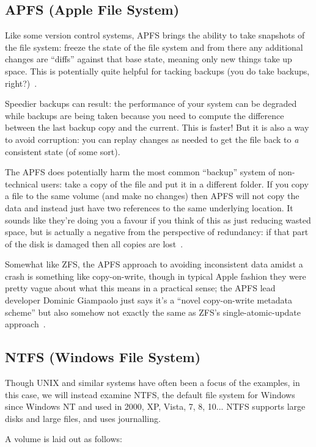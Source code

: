 \subsection*{APFS (Apple File System)}

Like some version control systems, APFS brings the ability to take snapshots of the file system: freeze the state of the file system and from there any additional changes are ``diffs'' against that base state, meaning only new things take up space. This is potentially quite helpful for tacking backups (you do take backups, right?)~\cite{apfs}.

Speedier backups can result: the performance of your system can be degraded while backups are being taken because you need to compute the difference between the last backup copy and the current. This is faster! But it is also a way to avoid corruption: you can replay changes as needed to get the file back to \textit{a} consistent state (of some sort).

The APFS does potentially harm the most common ``backup'' system of non-technical users: take a copy of the file and put it in a different folder. If you copy a file to the same volume (and make no changes) then APFS will not copy the data and instead just have two references to the same underlying location. It sounds like they're doing you a favour if you think of this as just reducing wasted space, but is actually a negative from the perspective of redundancy: if that part of the disk is damaged then all copies are lost~\cite{apfs}.

Somewhat like ZFS, the APFS approach to avoiding inconsistent data amidst a crash is something like copy-on-write, though in typical Apple fashion they were pretty vague about what this means in a practical sense; the APFS lead developer Dominic Giampaolo just says it's a ``novel copy-on-write metadata scheme'' but also somehow not exactly the same as ZFS's single-atomic-update approach~\cite{apfs}.

\subsection*{NTFS (Windows File System)}
Though UNIX and similar systems have often been a focus of the examples, in this case, we will instead examine NTFS, the default file system for Windows since Windows NT and used in 2000, XP, Vista, 7, 8, 10... NTFS supports large disks and large files, and uses journalling.

A volume is laid out as follows:

